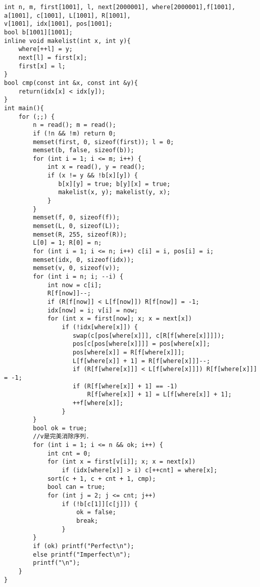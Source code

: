 \begin{lstlisting}
int n, m, first[1001], l, next[2000001], where[2000001],f[1001], a[1001], c[1001], L[1001], R[1001],
v[1001], idx[1001], pos[1001];
bool b[1001][1001];
inline void makelist(int x, int y){
    where[++l] = y;
    next[l] = first[x];
    first[x] = l;
}
bool cmp(const int &x, const int &y){
    return(idx[x] < idx[y]);
}
int main(){
    for (;;) {
        n = read(); m = read();
        if (!n && !m) return 0;
        memset(first, 0, sizeof(first)); l = 0;
        memset(b, false, sizeof(b));
        for (int i = 1; i <= m; i++) {
            int x = read(), y = read();
            if (x != y && !b[x][y]) {
               b[x][y] = true; b[y][x] = true;
               makelist(x, y); makelist(y, x);
            }
        }
        memset(f, 0, sizeof(f));
        memset(L, 0, sizeof(L));
        memset(R, 255, sizeof(R));
        L[0] = 1; R[0] = n;
        for (int i = 1; i <= n; i++) c[i] = i, pos[i] = i;
        memset(idx, 0, sizeof(idx));
        memset(v, 0, sizeof(v));
        for (int i = n; i; --i) {
            int now = c[i];
            R[f[now]]--;
            if (R[f[now]] < L[f[now]]) R[f[now]] = -1;
            idx[now] = i; v[i] = now;
            for (int x = first[now]; x; x = next[x])
                if (!idx[where[x]]) {
                   swap(c[pos[where[x]]], c[R[f[where[x]]]]);
                   pos[c[pos[where[x]]]] = pos[where[x]];
                   pos[where[x]] = R[f[where[x]]];
                   L[f[where[x]] + 1] = R[f[where[x]]]--;
                   if (R[f[where[x]]] < L[f[where[x]]]) R[f[where[x]]] = -1;
                   if (R[f[where[x]] + 1] == -1)
                       R[f[where[x]] + 1] = L[f[where[x]] + 1];
                   ++f[where[x]];
                }
        }
        bool ok = true;
        //v是完美消除序列.
        for (int i = 1; i <= n && ok; i++) {
            int cnt = 0;
            for (int x = first[v[i]]; x; x = next[x]) 
                if (idx[where[x]] > i) c[++cnt] = where[x];
            sort(c + 1, c + cnt + 1, cmp);
            bool can = true;
            for (int j = 2; j <= cnt; j++)
                if (!b[c[1]][c[j]]) {
                    ok = false;
                    break;
                }
        }
        if (ok) printf("Perfect\n");
        else printf("Imperfect\n");
        printf("\n");
    }
}
\end{lstlisting}
